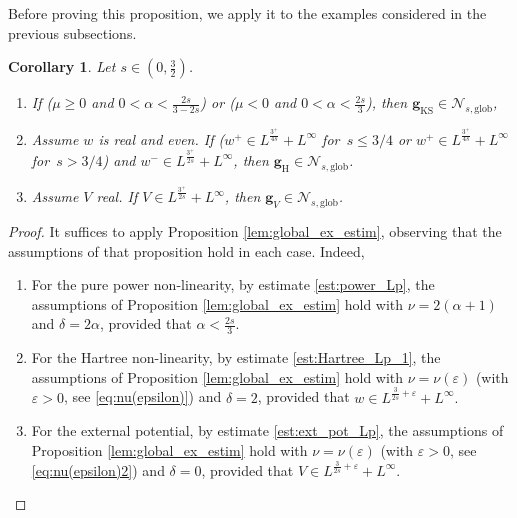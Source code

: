 \documentclass[12pt,a4paper]{amsart}
\newtheorem{corollary}[theorem]{Corollary}
\numberwithin{equation}{section}
\newcommand{\ulg}{\boldsymbol{g}}
\newcommand{\Nglob}{\mathscr{N}_{s,\mathrm{glob}}}
\begin{document}
	Before proving this proposition, we apply it to the examples considered in the previous subsections. 
	\begin{corollary}
		Let $s\in(0,\frac32)$. 
		\begin{enumerate}[label=\roman*)]
			\item If ($\mu\geq 0$ and $0<\alpha<\frac{2s}{3-2s}$) or ($\mu<0$ and $0<\alpha < \frac{2s}{3} $), then $\ulg_{\mathrm{KS}}\in\Nglob$,
			\item Assume $w$ is real and even. If ($w^{+} \in L^{\frac{3^+}{4s}} + L^{\infty}$ for~$s\leq 3/4$ or $w^{+} \in L^{\frac{3^+}{4s}} + L^{\infty}$ for~$s> 3/4$) and $w^{-} \in L^{\frac{3^+}{2s}} + L^{\infty}$, then $\ulg_{\mathrm{H}}\in\Nglob$.
			\item Assume $V$ real. If $V \in L^{\frac{3^+}{2s}} + L^{\infty}$, then $\ulg_V\in\Nglob$.
		\end{enumerate}
	\end{corollary}
	\begin{proof}
		It suffices to apply Proposition \ref{lem:global_ex_estim}, observing that the assumptions of that proposition hold in each case. Indeed,
		\begin{enumerate}[label=\roman*)]
			\item  For the pure power non-linearity, by estimate \eqref{est:power_Lp}, the assumptions of Proposition \ref{lem:global_ex_estim} hold with $\nu=2(\alpha+1)$ and $\delta = 2 \alpha $, provided that $\alpha < \frac{2s}{3} $. 
			\item For the Hartree non-linearity, by estimate \eqref{est:Hartree_Lp_1}, the assumptions of Proposition \ref{lem:global_ex_estim} hold with $\nu=\nu(\varepsilon)$ (with $\varepsilon>0$, see \eqref{eq:nu(epsilon)}) and $\delta=2$, provided that
			$w \in L^{\frac{3}{2s}+\varepsilon} + L^{\infty}.$
			\item For the external potential, by estimate \eqref{est:ext_pot_Lp}, the assumptions of Proposition \ref{lem:global_ex_estim} hold with  $\nu=\nu(\varepsilon)$ (with $\varepsilon>0$, see \eqref{eq:nu(epsilon)2}) and $\delta = 0$, provided that
			$V \in L^{\frac{3}{2s}+\varepsilon} + L^{\infty}.$
		\end{enumerate}
	\end{proof}
	
\end{document}
